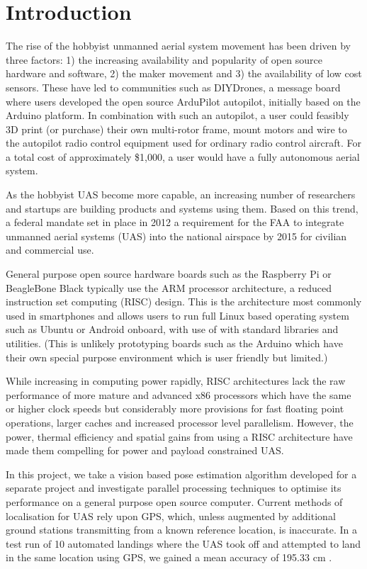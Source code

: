 \documentclass{acm_proc_article-sp}
\begin{document}
\section{Introduction}
The rise of the hobbyist unmanned aerial system movement has been driven by three factors: 1) the increasing availability and popularity of open source hardware and software, 2) the maker movement and 3) the availability of low cost sensors. These have led to communities such as DIYDrones, a message board where users developed the open source ArduPilot autopilot, initially based on the Arduino platform. In combination with such an autopilot, a user could feasibly 3D print (or purchase) their own multi-rotor frame, mount motors and wire to the autopilot radio control equipment used for ordinary radio control aircraft. For a total cost of approximately \$1,000, a user would have a fully autonomous aerial system.

 As the hobbyist UAS become more capable, an increasing number of researchers and startups are building products and systems using them.  Based on this trend, a federal mandate set in place in 2012 a requirement for the FAA to integrate unmanned aerial systems (UAS) into the national airspace by 2015 for civilian and commercial use.

General purpose open source hardware boards such as the Raspberry Pi or BeagleBone Black typically use the ARM processor architecture, a reduced instruction set computing (RISC) design. This is the architecture most commonly used in smartphones and allows users to run full Linux based operating system such as Ubuntu or Android onboard, with use of with standard libraries and utilities. (This is unlikely prototyping boards such as the Arduino which have their own special purpose environment which is user friendly but limited.) 

While increasing in computing power rapidly, RISC architectures lack the raw performance of more mature and advanced x86 processors which have the same or higher clock speeds but considerably more provisions for fast floating point operations, larger caches and increased processor level parallelism. However, the power, thermal efficiency and spatial gains from using a RISC architecture have made them compelling for power and payload constrained UAS.

In this project, we take a vision based pose estimation algorithm developed for a separate project and investigate parallel processing techniques to optimise its performance on a general purpose open source computer. Current methods of localisation for UAS rely upon GPS, which, unless augmented by additional ground stations transmitting from a known reference location, is inaccurate. In a test run of 10 automated landings where the UAS took off and attempted to land in the same location using GPS, we gained a mean accuracy of 195.33 cm \cite{berzanaccurate}.
\end{document}
